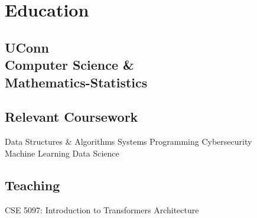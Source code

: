 \documentclass[]{resume-template}
\begin{document}
%
%
    \lastupdated{}

%
%

%
%

    \begin{minipage}[t]{0.33\textwidth}


        \section{Education}\label{sec:education}

        \subsection{UConn\\ Computer Science \&\\
        Mathematics-Statistics}\label{subsec:uconn}
        \vspace{\topsep}

        \subsection{Relevant Coursework}\label{subsec:coursework}
        Data Structures \& Algorithms \textbullet{} Systems Programming \textbullet{} Cybersecurity \textbullet{}\\ 
        Machine Learning \textbullet{} Data Science\\
        \sectionsep{}

        \subsection{Teaching}\label{subsec:teaching}
        CSE 5097: Introduction to Transformers Architecture




\end{minipage}
\end{document}
